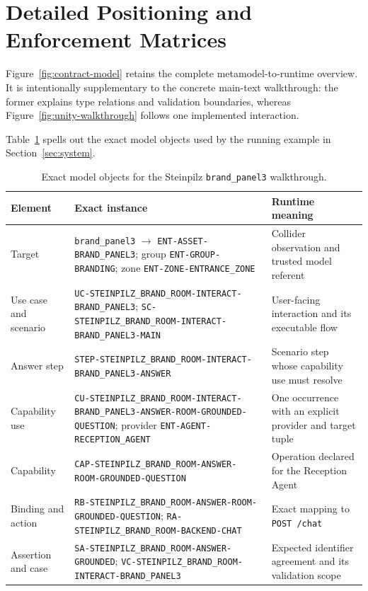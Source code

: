 \section{Detailed Positioning and Enforcement Matrices}

Figure~\ref{fig:contract-model} retains the complete metamodel-to-runtime
overview. It is intentionally supplementary to the concrete main-text
walkthrough: the former explains type relations and validation boundaries,
whereas Figure~\ref{fig:unity-walkthrough} follows one implemented interaction.



Table~\ref{tab:steinpilz-chain} spells out the exact model objects used by the
running example in Section~\ref{sec:system}.

\begin{table}[!htbp]
  \caption{Exact model objects for the Steinpilz
  \texttt{brand\_panel3} walkthrough.}
  \label{tab:steinpilz-chain}
  \small
  \setlength{\tabcolsep}{4pt}
  \begin{tabular}{@{}p{}p{}p{}@{}}
    \toprule
    Element & Exact instance & Runtime meaning \\
    \midrule
    Target &
    \nolinkurl{brand_panel3} $\rightarrow$
    \nolinkurl{ENT-ASSET-BRAND_PANEL3}; group
    \nolinkurl{ENT-GROUP-BRANDING}; zone
    \nolinkurl{ENT-ZONE-ENTRANCE_ZONE} &
    Collider observation and trusted model referent \\
    Use case and scenario &
    \nolinkurl{UC-STEINPILZ_BRAND_ROOM-INTERACT-BRAND_PANEL3};
    \nolinkurl{SC-STEINPILZ_BRAND_ROOM-INTERACT-BRAND_PANEL3-MAIN} &
    User-facing interaction and its executable flow \\
    Answer step &
    \nolinkurl{STEP-STEINPILZ_BRAND_ROOM-INTERACT-BRAND_PANEL3-ANSWER} &
    Scenario step whose capability use must resolve \\
    Capability use &
    \nolinkurl{CU-STEINPILZ_BRAND_ROOM-INTERACT-BRAND_PANEL3-ANSWER-ROOM-GROUNDED-QUESTION};
    provider \nolinkurl{ENT-AGENT-RECEPTION_AGENT} &
    One occurrence with an explicit provider and target tuple \\
    Capability &
    \nolinkurl{CAP-STEINPILZ_BRAND_ROOM-ANSWER-ROOM-GROUNDED-QUESTION} &
    Operation declared for the Reception Agent \\
    Binding and action &
    \nolinkurl{RB-STEINPILZ_BRAND_ROOM-ANSWER-ROOM-GROUNDED-QUESTION};
    \nolinkurl{RA-STEINPILZ_BRAND_ROOM-BACKEND-CHAT} &
    Exact mapping to \texttt{POST /chat} \\
    Assertion and case &
    \nolinkurl{SA-STEINPILZ_BRAND_ROOM-ANSWER-GROUNDED};
    \nolinkurl{VC-STEINPILZ_BRAND_ROOM-INTERACT-BRAND_PANEL3} &
    Expected identifier agreement and its validation scope \\
    \bottomrule
  \end{tabular}
\end{table}

